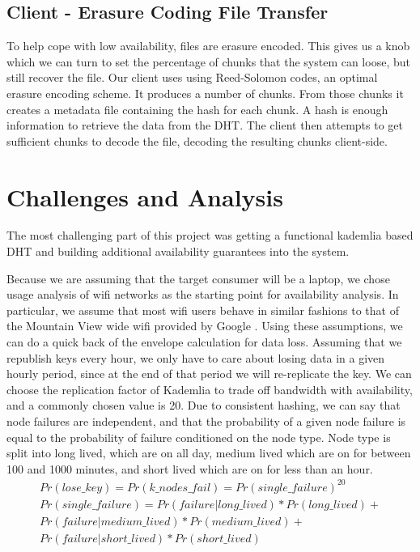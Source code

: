 \documentclass[a4paper,10pt]{article}
\begin{document}
\subsection{Client - Erasure Coding File Transfer}
To help cope with low availability, files are erasure encoded. This gives us a 
knob which we can turn to set the percentage of chunks that the system can 
loose, but still recover the file. Our client uses using Reed-Solomon codes, an 
optimal erasure encoding scheme. It produces a number of chunks. From those 
chunks it creates a metadata file containing the hash for each chunk. A hash is 
enough information to retrieve the data from the DHT. The client then 
attempts to get sufficient chunks to decode the file, decoding the resulting 
chunks client-side.

\section{Challenges and Analysis}
The most challenging part of this project was getting a functional kademlia 
based DHT and building additional availability guarantees into the system.

Because we are assuming that the target consumer will be a laptop, we chose 
usage analysis of wifi networks as the starting point for availability analysis.
In particular, we assume that most wifi users behave in similar fashions to 
that of the Mountain View wide wifi provided by Google \cite{wifi}.  Using 
these assumptions, we can do a quick back of the envelope calculation for data 
loss. Assuming that we republish keys every hour, we only have to care about 
losing data in a given hourly period, since at the end of that period we will 
re-replicate the key.  We can choose the replication factor of Kademlia to trade 
off bandwidth with availability, and a commonly chosen value is 20.  Due to 
consistent hashing, we can say that node failures are independent, and that the 
probability of a given node failure is equal to the probability of failure 
conditioned on the node type.  Node type is split into long lived, which are on 
all day, medium lived which are on for between 100 and 1000 minutes, and short 
lived which are on for less than an hour.  
\begin{multline}
Pr(lose\_key) = Pr(k\_nodes\_fail) = Pr(single\_failure)^{20}
\\
Pr(single\_failure) =
Pr(failure | long\_lived)*Pr(long\_lived) +
\\
Pr(failure | medium\_lived)*Pr(medium\_lived) +
\\
Pr(failure | short\_lived)*Pr(short\_lived)
\\
\end{multline}
\end{document}
